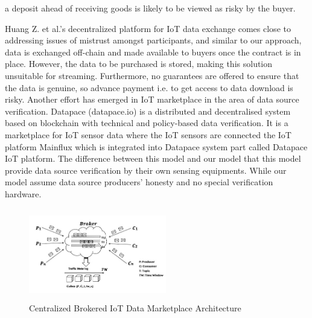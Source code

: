 \documentclass[12pt]{article}
\begin{document}
a deposit ahead of receiving goods is likely to be viewed as
risky by the buyer.\par
Huang Z. et al.’s decentralized platform for IoT data
exchange comes close to addressing issues of mistrust
amongst participants, and similar to our approach, data is
exchanged off-chain and made available to buyers once the
contract is in place. However, the data to be purchased
is stored, making this solution unsuitable for streaming.
Furthermore, no guarantees are offered to ensure that the
data is genuine, so advance payment i.e. to get access to
data download is risky.
Another effort has emerged in IoT marketplace in the area
of data source verification. Datapace (datapace.io) is a
distributed and decentralised system based on blockchain
with technical and policy-based data verification. It is a
marketplace for IoT sensor data where the IoT sensors are
connected the IoT platform Mainflux which is integrated
into Datapace system part called Datapace IoT platform.
The difference between this model and our model that this
model provide data source verification by their own sensing
equipments. While our model assume data source producers’
honesty and no special verification hardware.





\begin{figure}[h!]
\begin{center}
\includegraphics[width=6cm, height=4cm]{L3}
\caption{ Centralized Brokered IoT Data Marketplace Architecture}
\end{center}
\end{figure}
\end{document}
